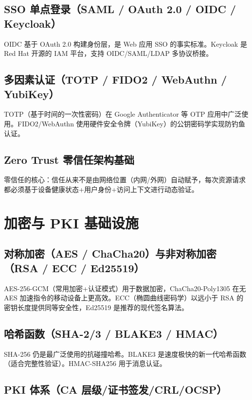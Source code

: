 \documentclass[12pt,UTF8]{ctexbook}
\begin{document}
  \section{SSO 单点登录（SAML / OAuth 2.0 / OIDC / Keycloak）}

OIDC 基于 OAuth 2.0 构建身份层，是 Web 应用 SSO 的事实标准。Keycloak 是 Red Hat 开源的 IAM 平台，支持 OIDC/SAML/LDAP 多协议桥接。

  \section{多因素认证（TOTP / FIDO2 / WebAuthn / YubiKey）}

TOTP（基于时间的一次性密码）在 Google Authenticator 等 OTP 应用中广泛使用。FIDO2/WebAuthn 使用硬件安全令牌（YubiKey）的公钥密码学实现防钓鱼认证。

  \section{Zero Trust 零信任架构基础}

零信任的核心：信任从来不是由网络位置（内网/外网）自动赋予，每次资源请求都必须基于设备健康状态+用户身份+访问上下文进行动态验证。


\chapter{加密与 PKI 基础设施}
\label{chap:crypto-pki}

  \section{对称加密（AES / ChaCha20）与非对称加密（RSA / ECC / Ed25519）}

AES-256-GCM（常用加密+认证模式）用于数据加密，ChaCha20-Poly1305 在无 AES 加速指令的移动设备上更高效。ECC（椭圆曲线密码学）以远小于 RSA 的密钥长度提供同等安全性，Ed25519 是推荐的现代签名算法。

  \section{哈希函数（SHA-2/3 / BLAKE3 / HMAC）}

SHA-256 仍是最广泛使用的抗碰撞哈希。BLAKE3 是速度极快的新一代哈希函数（适合完整性验证）。HMAC-SHA256 用于消息认证。

  \section{PKI 体系（CA 层级/证书签发/CRL/OCSP）}
\end{document}
